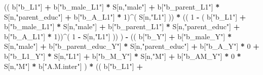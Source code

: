 \documentclass[
]{book}
\newenvironment{Shaded}{\begin{snugshade}}{\end{snugshade}}
\newcommand{\DecValTok}[1]{\textcolor[rgb]{0.00,0.00,0.81}{#1}}
\newcommand{\NormalTok}[1]{#1}
\newcommand{\SpecialCharTok}[1]{\textcolor[rgb]{0.81,0.36,0.00}{\textbf{#1}}}
\newcommand{\StringTok}[1]{\textcolor[rgb]{0.31,0.60,0.02}{#1}}
\begin{document}
\begin{Shaded}
\begin{Highlighting}[]
\NormalTok{                      (( b[}\StringTok{"b\_L1"}\NormalTok{] }\SpecialCharTok{+}
\NormalTok{                           b[}\StringTok{"b\_male\_L1"}\NormalTok{] }\SpecialCharTok{*}\NormalTok{ S[n,}\StringTok{"male"}\NormalTok{] }\SpecialCharTok{+}  
\NormalTok{                           b[}\StringTok{"b\_parent\_L1"}\NormalTok{] }\SpecialCharTok{*}\NormalTok{ S[n,}\StringTok{"parent\_educ"}\NormalTok{] }\SpecialCharTok{+}
\NormalTok{                           b[}\StringTok{"b\_A\_L1"}\NormalTok{] }\SpecialCharTok{*} \DecValTok{1}\NormalTok{)}\SpecialCharTok{\^{}}\NormalTok{( S[n,}\StringTok{"L1"}\NormalTok{] )) }\SpecialCharTok{*}
\NormalTok{                      (( }\DecValTok{1} \SpecialCharTok{{-}}\NormalTok{ ( b[}\StringTok{"b\_L1"}\NormalTok{] }\SpecialCharTok{+}
\NormalTok{                                 b[}\StringTok{"b\_male\_L1"}\NormalTok{] }\SpecialCharTok{*}\NormalTok{ S[n,}\StringTok{"male"}\NormalTok{] }\SpecialCharTok{+}  
\NormalTok{                                 b[}\StringTok{"b\_parent\_L1"}\NormalTok{] }\SpecialCharTok{*}\NormalTok{ S[n,}\StringTok{"parent\_educ"}\NormalTok{] }\SpecialCharTok{+}
\NormalTok{                                 b[}\StringTok{"b\_A\_L1"}\NormalTok{] }\SpecialCharTok{*} \DecValTok{1}\NormalTok{))}\SpecialCharTok{\^{}}\NormalTok{( }\DecValTok{1} \SpecialCharTok{{-}}\NormalTok{ S[n,}\StringTok{"L1"}\NormalTok{] )) ) }\SpecialCharTok{{-}} 
\NormalTok{                      (( b[}\StringTok{"b\_Y"}\NormalTok{] }\SpecialCharTok{+} 
\NormalTok{                          b[}\StringTok{"b\_male\_Y"}\NormalTok{] }\SpecialCharTok{*}\NormalTok{ S[n,}\StringTok{"male"}\NormalTok{] }\SpecialCharTok{+} 
\NormalTok{                          b[}\StringTok{"b\_parent\_educ\_Y"}\NormalTok{] }\SpecialCharTok{*}\NormalTok{ S[n,}\StringTok{"parent\_educ"}\NormalTok{] }\SpecialCharTok{+} 
\NormalTok{                          b[}\StringTok{"b\_A\_Y"}\NormalTok{] }\SpecialCharTok{*} \DecValTok{0} \SpecialCharTok{+} 
\NormalTok{                          b[}\StringTok{"b\_L1\_Y"}\NormalTok{] }\SpecialCharTok{*}\NormalTok{ S[n,}\StringTok{"L1"}\NormalTok{] }\SpecialCharTok{+}
\NormalTok{                          b[}\StringTok{"b\_M\_Y"}\NormalTok{] }\SpecialCharTok{*}\NormalTok{ S[n,}\StringTok{"M"}\NormalTok{] }\SpecialCharTok{+}
\NormalTok{                          b[}\StringTok{"b\_AM\_Y"}\NormalTok{] }\SpecialCharTok{*} \DecValTok{0} \SpecialCharTok{*}\NormalTok{ S[n,}\StringTok{"M"}\NormalTok{] }\SpecialCharTok{*}\NormalTok{ b[}\StringTok{"A.M.inter"}\NormalTok{] ) }\SpecialCharTok{*}
\NormalTok{                      (( b[}\StringTok{"b\_L1"}\NormalTok{] }\SpecialCharTok{+}

\end{Highlighting}
\end{Shaded}
\end{document}
